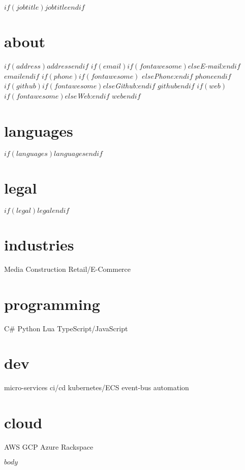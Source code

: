 \documentclass[]{template/friggeri-cv}
\begin{document}
       $if(jobtitle)${$jobtitle$}$endif$

\begin{aside}
  \section{about}
    $if(address)${$address$}$endif$
    $if(email)$$if(fontawesome)$\faEnvelopeO \hspace{1 mm}$else$\emph{E-mail:}$endif$ \href{mailto:}{\tt $email$}$endif$
    $if(phone)$$if(fontawesome)$ \faPhone \hspace{1 mm}$else$\emph{Phone:}$endif$  $phone$$endif$ 
    $if(github)$$if(fontawesome)$\faGithub \hspace{1 mm}$else$\emph{Github:}$endif$ \href{http://github.com/$github$}{\tt $github$}$endif$     $if(web)$$if(fontawesome)$\faGlobe \hspace{1 mm}$else$\emph{Web:}$endif$ \href{http://$web$}{\tt $web$}$endif$
  \section{languages}
    $if(languages)${$languages$}$endif$
  \section{legal}
    $if(legal)${$legal$}$endif$
  \section{industries}
    Media
    Construction
    Retail/E-Commerce
  \section{programming}
    C\#
    Python
    Lua
    TypeScript/JavaScript
  \section{dev}
    micro-services
    ci/cd
    kubernetes/ECS
    event-bus
    automation
  \section{cloud}
    AWS
    GCP
    Azure
    Rackspace
\end{aside}

$body$
\end{document}
